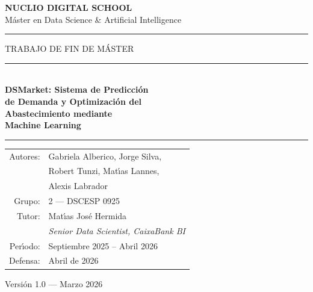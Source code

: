 \documentclass[12pt, a4paper, oneside]{report}
\begin{document}
\begin{titlepage}
\pagecolor{nuclioblue}

\begin{center}

\vspace*{0.8cm}

{%
  \fontsize{26}{32}\bfseries\color{white}%
  NUCLIO \textcolor{nuclioyellow}{DIGITAL SCHOOL}%
}\\[0.15cm]
{\small\color{white!75} M\'aster en Data Science \& Artificial Intelligence}\\[0.1cm]
{\color{nuclioyellow}\rule{0.7\textwidth}{1pt}}

\vspace{1.4cm}

{\small\color{white!80}\MakeUppercase{Trabajo de Fin de M\'aster}}\\[0.4cm]
{\color{nuclioyellow}\rule{0.7\textwidth}{2pt}}\\[0.6cm]

{\fontsize{24}{30}\bfseries\color{white}
  DSMarket: Sistema de Predicci\'on\\[0.2cm]
  de Demanda y Optimizaci\'on del\\[0.2cm]
  Abastecimiento mediante\\[0.2cm]
  Machine Learning
}\\[0.6cm]

{\color{nuclioyellow}\rule{0.7\textwidth}{2pt}}

\vspace{1.4cm}

\begin{tabular}{rl}
  \color{white!70}Autores: & \color{white}Gabriela Alberico, Jorge Silva,\\
                           & \color{white}Robert Tunzi, Mat\'{\i}as Lannes,\\
                           & \color{white}Alexis Labrador \\[4pt]
  \color{white!70}Grupo: & \color{white}2 --- DSCESP 0925 \\[4pt]
  \color{white!70}Tutor: & \color{white}Mat\'{\i}as Jos\'e Hermida \\
                         & \color{white!60}\small\itshape Senior Data Scientist, CaixaBank BI \\[4pt]
  \color{white!70}Per\'{\i}odo: & \color{white}Septiembre 2025 -- Abril 2026 \\[4pt]
  \color{white!70}Defensa: & \color{white}Abril de 2026 \\
\end{tabular}

\vfill

{\small\color{white!50} Versi\'on 1.0 --- Marzo 2026}

\end{center}
\end{titlepage}
\nopagecolor
\end{document}
